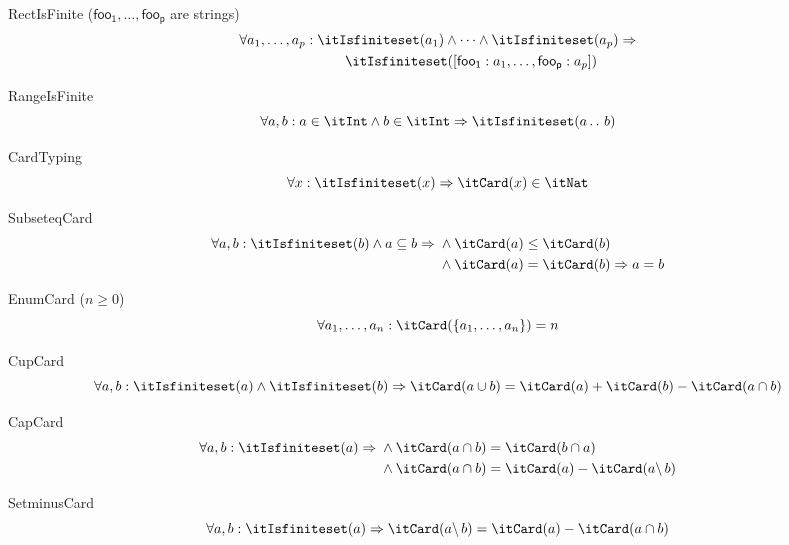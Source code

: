 \documentclass[11pt, a4paper, oneside]{article}
\begin{document}
\begin{axioms}
\item[RectIsFinite (\rm$\mathsf{foo_1},\dots,\mathsf{foo_p}$ are strings)] \[
        \begin{aligned}
            \forall a_1, \dots, a_p :\; &\itIsfiniteset(a_1) \wedge \dots \wedge \itIsfiniteset(a_p) \imp \\
            &\qquad \itIsfiniteset(\bx{ \mathsf{foo_1} : a_1, \dots, \mathsf{foo_p} : a_p })
        \end{aligned}
    \]

\item[RangeIsFinite] \[
        \forall a, b : a \in \itInt \wedge b \in \itInt \imp \itIsfiniteset(a \ltwodots b)
    \]

\item[CardTyping] \[
        \forall x : \itIsfiniteset(x) \imp \itCard(x) \in \itNat
    \]

\item[SubseteqCard] \[
        \forall a, b : \itIsfiniteset(b) \wedge a \subseteq b \imp \begin{aligned}[t]
            &\wedge \itCard(a) \le \itCard(b) \\
            &\wedge \itCard(a) = \itCard(b) \imp a = b
        \end{aligned}
    \]

\item[EnumCard ($n \ge 0$)] \[
        \forall a_1, \dots, a_n : \itCard(\st{ a_1, \dots, a_n }) = n
    \]

\item[CupCard] \[
        \forall a, b : \itIsfiniteset(a) \wedge \itIsfiniteset(b) \imp \itCard(a \cup b) = \itCard(a) + \itCard(b) - \itCard(a \cap b)
    \]

\item[CapCard] \[
        \forall a, b : \itIsfiniteset(a) \imp \begin{aligned}[t]
            &\wedge \itCard(a \cap b) = \itCard(b \cap a) \\
            &\wedge \itCard(a \cap b) = \itCard(a) - \itCard(a \backslash\, b)
        \end{aligned}
    \]

\item[SetminusCard] \[
        \forall a, b : \itIsfiniteset(a) \imp \itCard(a \backslash\, b) = \itCard(a) - \itCard(a \cap b)
    \]



\end{axioms}
\end{document}
